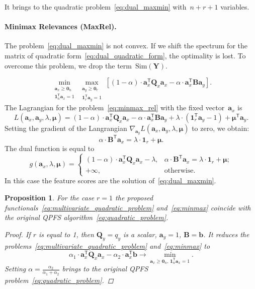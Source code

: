 \documentclass[12pt,twoside]{article}
\newtheorem{proposition}{Proposition}
\theoremstyle{definition}
\newcommand{\ba}{\mathbf{a}}
\newcommand{\bb}{\mathbf{b}}
\newcommand{\bY}{\mathbf{Y}}
\newcommand{\bB}{\mathbf{B}}
\newcommand{\bQ}{\mathbf{Q}}
\newcommand{\T}{\mathsf{T}}
\newcommand{\bmu}{\boldsymbol{\mu}}
\newcommand{\bOne}{\boldsymbol{1}}
\newcommand{\bZero}{\boldsymbol{0}}
\begin{document}
It brings to the quadratic problem~\eqref{eq:dual_maxmin} with~$n + r + 1$ variables.

\paragraph{Minimax Relevances (MaxRel).}

The problem~\eqref{eq:dual_maxmin} is not convex. If we shift the spectrum for the matrix of quadratic form~\eqref{eq:dual_quadratic_form}, the optimality is lost. To overcome this problem, we drop the term~$\text{Sim}(\bY)$.

\begin{equation}
\min_{\substack{\ba_x \geq \bZero_n \\ \bOne_n^{\T}\ba_x=1}} 	\max_{\substack{\ba_y \geq \bZero_r \\ \bOne_r^{\T}\ba_y=1}} \left[ (1 - \alpha) \cdot \ba_x^{\T} \bQ_x \ba_x - \alpha \cdot \ba_x^{\T} \bB \ba_y \right].
\label{eq:minmax_rel}
\end{equation}
The Lagrangian for the problem~\eqref{eq:minmax_rel} with the fixed vector~$\ba_x$ is
\[
L(\ba_x, \ba_y, \lambda, \bmu) = (1 - \alpha) \cdot \ba_x^{\T} \bQ_x \ba_x - \alpha \cdot \ba_x^{\T} \bB \ba_y + \lambda \cdot  (\bOne_r^{\T} \ba_y - 1) + \bmu^{\T} \ba_y.
\]
Setting the gradient of the Langrangian $\nabla_{\ba_y} L(\ba_x, \ba_y, \lambda, \bmu)$ to zero, we obtain:
\begin{equation*}
\alpha \cdot \bB^{\T} \ba_x = \lambda \cdot \bOne_r + \bmu.
\end{equation*}
The dual function is equal to
\begin{equation}
g(\ba_x, \lambda, \bmu) =
\begin{cases}
(1 - \alpha) \cdot \ba_x^{\T} \bQ_x \ba_x - \lambda, & \alpha \cdot \bB^{\T} \ba_x = \lambda \cdot \bOne_r + \bmu;  \\
+ \infty, & \text{otherwise}.
\end{cases}
\end{equation}
In this case the feature scores are the solution of~\eqref{eq:dual_maxmin}.

\begin{proposition}
	For the case $r=1$ the proposed functionals~\eqref{eq:multivariate_quadratic_problem} and~\eqref{eq:minmax} coincide with the original QPFS algorithm~\eqref{eq:quadratic_problem}.

	\begin{proof}
		If $r$ is equal to 1, then $\bQ_y = q_y$ is a scalar, $\ba_y = 1$, $\bB = \bb$. It reduces the problems~\eqref{eq:multivariate_quadratic_problem} and~\eqref{eq:minmax} to
		\[
		\alpha_1 \cdot \ba_x^{\T} \bQ_x \ba_x - \alpha_2 \cdot \ba_x^{\T} \bb \rightarrow \min_{\ba_x \geq \bZero_n, \, \bOne_n^{\T}\ba_x=1} .
		\]
		Setting $\alpha = \frac{\alpha_2}{\alpha_1 + \alpha_2}$ brings to the original QPFS problem~\eqref{eq:quadratic_problem}.
	\end{proof}
\end{proposition}
\end{document}
